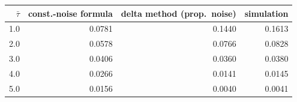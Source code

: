 \begin{tabular}{rrrr}
\toprule
$\bar\tau$ & const.-noise formula & delta method (prop.\ noise) & simulation \\
\midrule
1.0 & 0.0781 & 0.1440 & 0.1613 \\
2.0 & 0.0578 & 0.0766 & 0.0828 \\
3.0 & 0.0406 & 0.0360 & 0.0380 \\
4.0 & 0.0266 & 0.0141 & 0.0145 \\
5.0 & 0.0156 & 0.0040 & 0.0041 \\
\bottomrule
\end{tabular}

